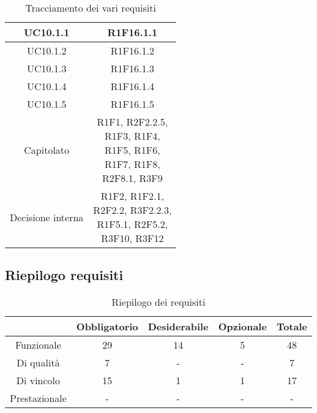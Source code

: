 \begin{table}[H]
\begin{tabular}{c | c}
		UC10.1.1                                                & R1F16.1.1                        \\ \hline
		UC10.1.2                                                & R1F16.1.2                        \\ \hline
		UC10.1.3                                                & R1F16.1.3                        \\ \hline
		UC10.1.4                                                & R1F16.1.4                        \\ \hline
		UC10.1.5                                                & R1F16.1.5                        \\ \hline
		Capitolato                                              & \Shortunderstack{R1F1, R2F2.2.5, \\R1F3, R1F4, \\R1F5, R1F6, \\R1F7, R1F8,\\ R2F8.1, R3F9\\}  \\ \hline
		Decisione interna                                       & \Shortunderstack{R1F2,  R1F2.1,  \\R2F2.2, R3F2.2.3,\\ R1F5.1, R2F5.2,\\ R3F10, R3F12\\} \\
	\end{tabular}
	\caption{Tracciamento dei vari requisiti}
\end{table}

\subsection{Riepilogo requisiti} \label{subsection: riepilogo}

\begin{table}[H]
	\centering
	\renewcommand{\arraystretch}{1.8}
	\begin{tabular}{c | c | c | c | c}
		\rowcolor[HTML]{125E28}
		\multicolumn{1}{c}{\color[HTML]{FFFFFF} \textbf{Tipologia}}    &
		\multicolumn{1}{c}{\color[HTML]{FFFFFF} \textbf{Obbligatorio}} &
		\multicolumn{1}{c}{\color[HTML]{FFFFFF} \textbf{Desiderabile}} &
		\multicolumn{1}{c}{\color[HTML]{FFFFFF} \textbf{Opzionale}}    &
		\multicolumn{1}{c}{\color[HTML]{FFFFFF} \textbf{Totale}}                          \\
		\hline
		Funzionale                                                     & 29 & 14 & 5 & 48 \\ \hline
		Di qualità                                                     & 7  & -  & - & 7  \\ \hline
		Di vincolo                                                     & 15 & 1  & 1 & 17 \\ \hline
		Prestazionale                                                  & -  & -  & - & -  \\
	\end{tabular}
	\caption{Riepilogo dei requisiti}
\end{table}